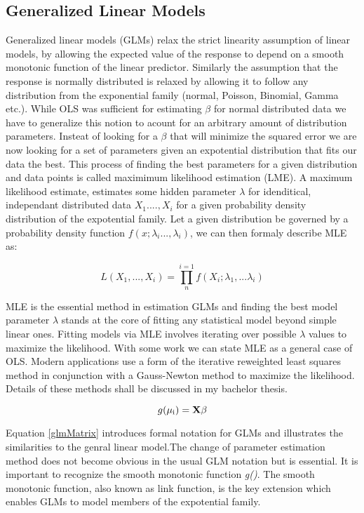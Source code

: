 \documentclass{article}
\begin{document}
    \subsection{Generalized Linear Models}
    Generalized linear models (GLMs) relax the strict linearity assumption of linear models, by allowing the expected value of the response to depend on a smooth monotonic function of the linear predictor. Similarly the assumption that the response is normally distributed is relaxed by allowing it to follow any distribution from the exponential family (normal, Poisson, Binomial, Gamma etc.). While OLS was sufficient for estimating $\beta$ for normal distributed data we have to generalize this notion to acount for an arbitrary amount of distribution parameters. Insteat of looking for a $\beta$ that will minimize the squared error we are now looking for a set of parameters given an expotential distribution that fits our data the best. This process of finding the best parameters for a given distribution and data points is called maximimum likelihood estimation (LME). A maximum likelihood estimate, estimates some hidden parameter $\lambda$ for idenditical, independant distributed data $X_1 ...., X_i$ for a given probability density distribution of the expotential family. Let a given distribution be governed by a probability density function $f(x; \lambda_i ..., \lambda_i)$, we can then formaly describe MLE as:

    \begin{equation} \label{MLE} L(X_1, ..., X_i) =  \prod_{n}^{i=1} f(X_i; \lambda_1, ... \lambda_i) \end{equation}

    MLE is the essential method in estimation GLMs and finding the best model parameter $\lambda$ stands at the core of fitting any statistical model beyond simple linear ones. Fitting models via MLE involves iterating over possible $\lambda$ values to maximize the likelihood. With some work we can state MLE as a general case of OLS. Modern applications use a form of the iterative reweighted least squares method in conjunction with a Gauss-Newton method to maximize the likelihood. Details of these methods shall be discussed in my bachelor thesis.

    \begin{equation} \label{glmMatrix} g(\mu\textsubscript{i}) = \mathbf{X} \beta \end{equation}


    Equation \ref{glmMatrix} introduces formal notation for GLMs and illustrates the similarities to the genral linear model.The change of parameter estimation method does not become obvious in the usual GLM notation but is essential. It is important to recognize the smooth monotonic function \textit{g()}. The smooth monotonic function, also known as link function, is the key extension which enables GLMs to model members of the expotential family.
\end{document}
